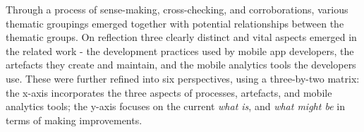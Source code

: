 Through a process of sense-making, cross-checking, and corroborations, various thematic groupings emerged together with potential relationships between the thematic groups. On reflection three clearly distinct and vital aspects emerged in the related work - the development practices used by mobile app developers, the artefacts they create and maintain, and the mobile analytics tools the developers use. These were further refined into six perspectives, using a three-by-two matrix: the x-axis incorporates the three aspects of processes, artefacts, and mobile analytics tools; the y-axis focuses on the current \emph{what is}, and \emph{what might be} in terms of making improvements. %





